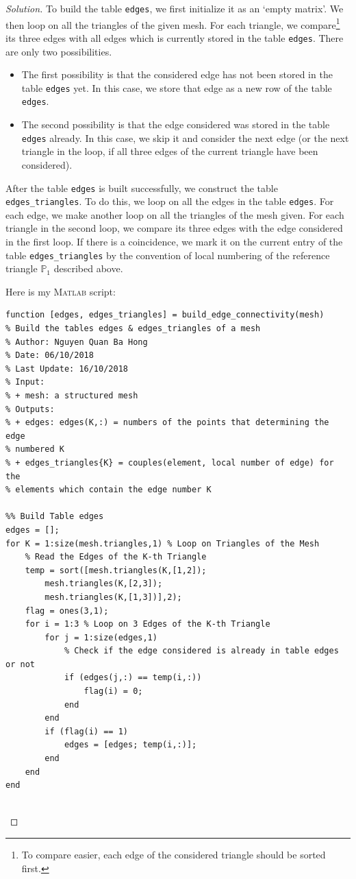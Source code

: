 \documentclass[11pt,a4paper,center,notitlepage]{article}
\numberwithin{equation}{section}
\begin{document}
\begin{proof}[Solution] 
To build the table \verb|edges|, we first initialize it as an `empty matrix'. We then loop on all the triangles of the given mesh. For each triangle, we compare\footnote{To compare easier, each edge of the considered triangle should be sorted first.} its three edges with all edges which is currently stored in the table \verb|edges|. There are only two possibilities. 
\begin{itemize}
\item The first possibility is that the considered edge has not been stored in the table \verb|edges| yet. In this case, we store that edge as a new row of the table \verb|edges|.
\item The second possibility is that the edge considered was stored in the table \verb|edges| already. In this case, we skip it and consider the next edge (or the next triangle in the loop, if all three edges of the current triangle have been considered).
\end{itemize}
After the table \verb|edges| is built successfully, we construct the table \verb|edges_triangles|. To do this, we loop on all the edges in the table \verb|edges|. For each edge, we make another loop on all the triangles of the mesh given. For each triangle in the second loop, we compare its three edges with the edge considered in the first loop. If there is a coincidence, we mark it on the current entry of the table \verb|edges_triangles| by the convention of local numbering of the reference triangle $\mathbb{P}_1$ described above.

Here is my \textsc{Matlab} script:
\begin{verbatim}
function [edges, edges_triangles] = build_edge_connectivity(mesh)
% Build the tables edges & edges_triangles of a mesh
% Author: Nguyen Quan Ba Hong
% Date: 06/10/2018
% Last Update: 16/10/2018
% Input:
% + mesh: a structured mesh
% Outputs:
% + edges: edges(K,:) = numbers of the points that determining the edge
% numbered K
% + edges_triangles{K} = couples(element, local number of edge) for the
% elements which contain the edge number K

%% Build Table edges
edges = [];
for K = 1:size(mesh.triangles,1) % Loop on Triangles of the Mesh
    % Read the Edges of the K-th Triangle
    temp = sort([mesh.triangles(K,[1,2]);
        mesh.triangles(K,[2,3]);
        mesh.triangles(K,[1,3])],2);
    flag = ones(3,1);
    for i = 1:3 % Loop on 3 Edges of the K-th Triangle
        for j = 1:size(edges,1)
            % Check if the edge considered is already in table edges or not
            if (edges(j,:) == temp(i,:))
                flag(i) = 0;
            end
        end
        if (flag(i) == 1)
            edges = [edges; temp(i,:)];
        end
    end
end


\end{verbatim}
\end{proof}
\end{document}
